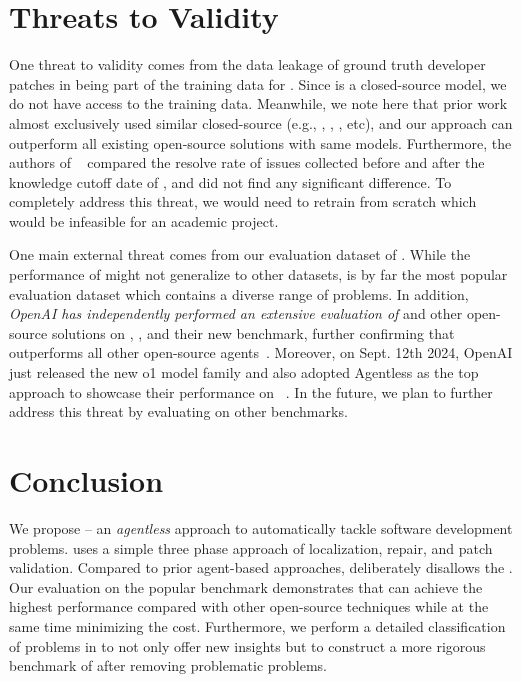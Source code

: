 \section{Threats to Validity}

One threat to validity comes from the data leakage of ground truth developer patches in \swebenchlite being part of the training data for \gptfouro. 
Since \gptfouro is a closed-source model, we do not have access to the training data.
Meanwhile, we note here that prior work almost exclusively used similar closed-source  (e.g., \gptfouro, \gptfour, , etc), and our approach can outperform all existing open-source solutions with same models.
Furthermore, the authors of \swebench~\cite{swebench} compared the resolve rate of issues collected before and after the knowledge cutoff date of \gptfour, and did not find any significant difference.  
To completely address this threat, we would need to retrain \gptfouro from scratch which would be infeasible for an academic project.

One main external threat comes from our evaluation dataset of \swebenchlite.
While the performance of \tech might not generalize to other datasets, \swebenchlite is by far the most popular evaluation dataset which contains a diverse range of problems.
In addition, \emph{OpenAI has independently performed an extensive evaluation of \tech} and other open-source solutions on \swebenchlite, \swebench, and their new \swebenchverified benchmark, further confirming that \tech outperforms all other open-source agents~\cite{openaiverified}. Moreover, on Sept. 12th 2024, OpenAI just released the new o1 model family and also adopted Agentless as the top approach to showcase their performance on \swebench~\cite{openaioonesystemcard}.
In the future, we plan to further address this threat by evaluating \tech on other benchmarks.

\section{Conclusion}

We propose \tech -- an \emph{agentless} approach to automatically tackle software development problems. 
\tech uses a simple three phase approach of localization, repair, and patch validation. 
Compared to prior agent-based approaches, \tech deliberately disallows the . 
Our evaluation on the popular \swebenchlite benchmark demonstrates that \tech can achieve the highest performance compared with other open-source techniques while at the same time minimizing the cost. 
Furthermore, we perform a detailed classification of problems in \swebenchlite to not only offer new insights but to construct a more rigorous benchmark of \swebenchlitefiltered{} after removing problematic problems.

